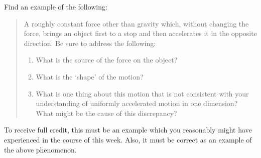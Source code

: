 \documentclass{reflection}
\begin{document}
\maketitle

Find an example of the following:
\begin{quote}
    A roughly constant force other than gravity which, without changing the force, brings an object first to a stop and then accelerates it in the opposite direction. Be sure to address the following:
    \begin{enumerate}
        \item What is the source of the force on the object?
        \item What is the `shape' of the motion?
        \item What is one thing about this motion that is not consistent with your understanding of uniformly accelerated motion in one dimension? What might be the cause of this discrepancy?
    \end{enumerate}
\end{quote}

To receive full credit, this must be an example which you reasonably might have experienced in the course of this week. Also, it must be correct as an example of the above phenomenon.

\end{document}
